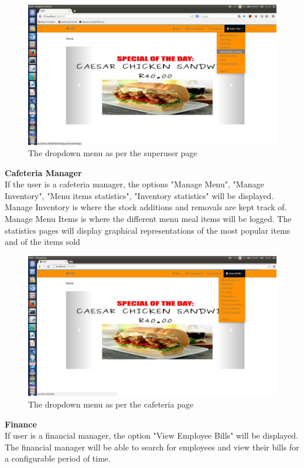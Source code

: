 \documentclass[a4paper,12pt]{report}
\begin{document}
\begin{figure}[H]
  \centering
    \includegraphics[width=1.0\textwidth]{screenshots/superUserMenu.png}
    \caption{The dropdown menu as per the superuser page} 
\end{figure}


\textbf{Cafeteria Manager}\\
If the user is a cafeteria manager, the options "Manage Menu", "Manage Inventory", "Menu items statistics", "Inventory statistics" will be displayed. Manage Inventory is where the stock additions and removals are kept track of. Manage Menu Items  is where the different menu meal items will be logged. The statistics pages will display graphical representations of the most popular items and of the items sold\\

\begin{figure}[H]
  \centering
    \includegraphics[width=1.0\textwidth]{screenshots/cafeteriaMenu.png}
    \caption{The dropdown menu as per the cafeteria page} 
\end{figure}

\textbf{Finance}\\
If user is a financial manager, the option "View Employee Bills" will be displayed. The financial manager will be able to search for employees and view their bills for a configurable period of time.\\
\end{document}
